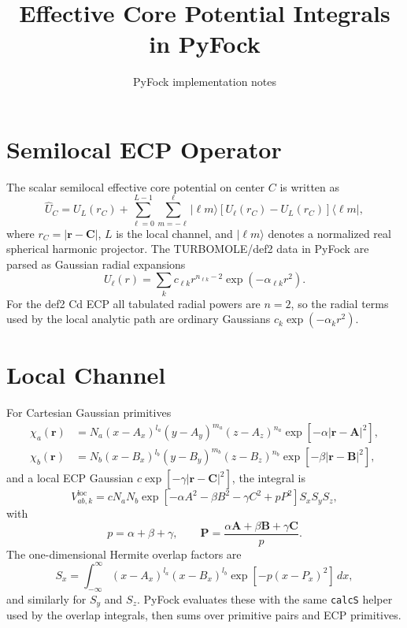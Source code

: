 \documentclass[11pt]{article}
\title{Effective Core Potential Integrals in PyFock}
\author{PyFock implementation notes}
\date{}
\begin{document}
\maketitle

\section{Semilocal ECP Operator}

The scalar semilocal effective core potential on center \(C\) is written as
\begin{equation}
  \hat U_C =
  U_L(r_C) +
  \sum_{\ell=0}^{L-1}\sum_{m=-\ell}^{\ell}
  |\ell m\rangle
  \left[ U_\ell(r_C)-U_L(r_C) \right]
  \langle \ell m | ,
\end{equation}
where \(r_C = |\mathbf r-\mathbf C|\), \(L\) is the local channel, and
\(|\ell m\rangle\) denotes a normalized real spherical harmonic projector.
The TURBOMOLE/def2 data in PyFock are parsed as Gaussian radial expansions
\begin{equation}
  U_\ell(r) = \sum_k c_{\ell k} r^{n_{\ell k}-2}
  \exp(-\alpha_{\ell k} r^2).
\end{equation}
For the def2 Cd ECP all tabulated radial powers are \(n=2\), so the radial
terms used by the local analytic path are ordinary Gaussians
\(c_k\exp(-\alpha_k r^2)\).

\section{Local Channel}

For Cartesian Gaussian primitives
\begin{align}
  \chi_a(\mathbf r) &=
  N_a (x-A_x)^{l_a}(y-A_y)^{m_a}(z-A_z)^{n_a}
  \exp[-\alpha|\mathbf r-\mathbf A|^2],\\
  \chi_b(\mathbf r) &=
  N_b (x-B_x)^{l_b}(y-B_y)^{m_b}(z-B_z)^{n_b}
  \exp[-\beta|\mathbf r-\mathbf B|^2],
\end{align}
and a local ECP Gaussian \(c\exp[-\gamma|\mathbf r-\mathbf C|^2]\), the integral is
\begin{equation}
  V^{\mathrm{loc}}_{ab,k}
  =
  c N_a N_b
  \exp\left[-\alpha A^2-\beta B^2-\gamma C^2
  + p P^2\right]
  S_x S_y S_z,
\end{equation}
with
\begin{equation}
  p=\alpha+\beta+\gamma,\qquad
  \mathbf P = \frac{\alpha\mathbf A+\beta\mathbf B+\gamma\mathbf C}{p}.
\end{equation}
The one-dimensional Hermite overlap factors are
\begin{equation}
  S_x =
  \int_{-\infty}^{\infty}
  (x-A_x)^{l_a}(x-B_x)^{l_b}
  \exp[-p(x-P_x)^2]\,dx ,
\end{equation}
and similarly for \(S_y\) and \(S_z\). PyFock evaluates these with the same
\texttt{calcS} helper used by the overlap integrals, then sums over primitive
pairs and ECP primitives.
\end{document}
